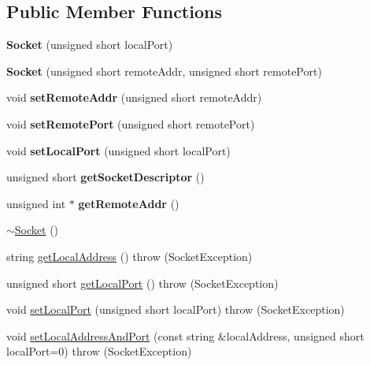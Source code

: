 \subsection*{Public Member Functions}
\begin{DoxyCompactItemize}
\item 
\hypertarget{classSocket_ad585c3f2a21f2511a5dea235923c59ee}{{\bfseries Socket} (unsigned short local\-Port)}\label{classSocket_ad585c3f2a21f2511a5dea235923c59ee}

\item 
\hypertarget{classSocket_a32ef908835f62b11ba5b86c18a0bfe28}{{\bfseries Socket} (unsigned short remote\-Addr, unsigned short remote\-Port)}\label{classSocket_a32ef908835f62b11ba5b86c18a0bfe28}

\item 
\hypertarget{classSocket_a2d8cf63685c29463181d8e5536e0f3cc}{void {\bfseries set\-Remote\-Addr} (unsigned short remote\-Addr)}\label{classSocket_a2d8cf63685c29463181d8e5536e0f3cc}

\item 
\hypertarget{classSocket_a54dd43a68403812d58ea9e2e8024cf45}{void {\bfseries set\-Remote\-Port} (unsigned short remote\-Port)}\label{classSocket_a54dd43a68403812d58ea9e2e8024cf45}

\item 
\hypertarget{classSocket_a773fe4a35146002de76952e16fdebcfa}{void {\bfseries set\-Local\-Port} (unsigned short local\-Port)}\label{classSocket_a773fe4a35146002de76952e16fdebcfa}

\item 
\hypertarget{classSocket_a2bcd6d8cca7a9dfd88b3101732d0abcc}{unsigned short {\bfseries get\-Socket\-Descriptor} ()}\label{classSocket_a2bcd6d8cca7a9dfd88b3101732d0abcc}

\item 
\hypertarget{classSocket_a5774a66b0f9d58380bf248c08c0dd33c}{unsigned int $\ast$ {\bfseries get\-Remote\-Addr} ()}\label{classSocket_a5774a66b0f9d58380bf248c08c0dd33c}

\item 
\hyperlink{classSocket_aeac4eb6379a543d38ed88977d3b6630a}{$\sim$\-Socket} ()
\item 
string \hyperlink{classSocket_a0fca07bdfa97874fba1a17995ed7cda3}{get\-Local\-Address} ()  throw (\-Socket\-Exception)
\item 
unsigned short \hyperlink{classSocket_ae01143b667d69483a2f53d0f4ce7eeed}{get\-Local\-Port} ()  throw (\-Socket\-Exception)
\item 
void \hyperlink{classSocket_a773fe4a35146002de76952e16fdebcfa}{set\-Local\-Port} (unsigned short local\-Port)  throw (\-Socket\-Exception)
\item 
void \hyperlink{classSocket_aa6b986410bc2e606ba27d01fa7cb8836}{set\-Local\-Address\-And\-Port} (const string \&local\-Address, unsigned short local\-Port=0)  throw (\-Socket\-Exception)
\end{DoxyCompactItemize}
